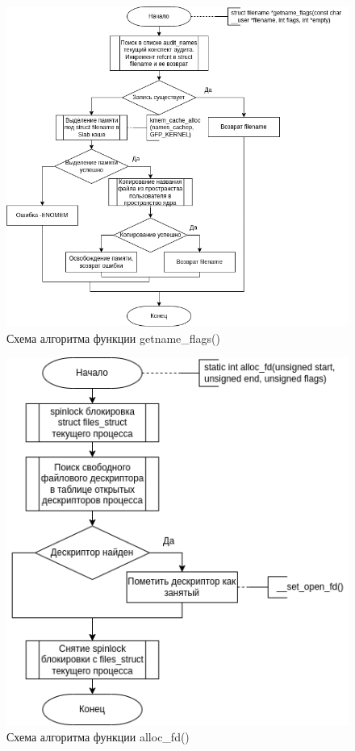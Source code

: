 \documentclass[14pt,a4paper]{scrreprt}
\begin{document}
\begin{figure}[H]
	\begin{center}
		\includegraphics[scale=0.53]{assets/getname_flags.png}
	\end{center}
	\caption{Схема алгоритма функции getname\_flags()}
\end{figure}

\begin{figure}[H]
	\begin{center}
		\includegraphics[scale=0.52]{assets/alloc_fd.png}
	\end{center}
	\caption{Схема алгоритма функции alloc\_fd()}
\end{figure}
\end{document}

